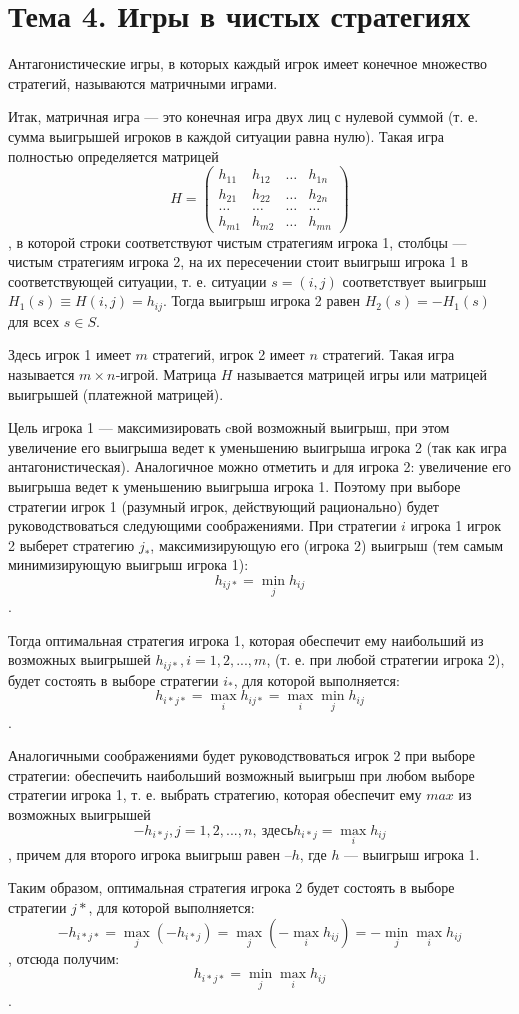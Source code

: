 \section{Тема 4. Игры в чистых стратегиях}

Антагонистические игры, в которых каждый игрок имеет конечное множество стратегий, называются матричными играми.

Итак, матричная игра --- это конечная игра двух лиц с нулевой суммой (т. е. сумма выигрышей игроков в каждой ситуации равна нулю). Такая игра полностью определяется матрицей
\[ H = \begin{pmatrix}
h_{11} & h_{12} & \dots & h_{1n} \\ 
h_{21} & h_{22} & \dots & h_{2n} \\ 
\dots & \dots & \dots & \dots \\ 
h_{m1} & h_{m2} & \dots & h_{mn}
\end{pmatrix}  \],
в которой строки соответствуют чистым стратегиям игрока 1, столбцы --- чистым стратегиям игрока 2, на их пересечении стоит выигрыш игрока 1 в соответствующей ситуации, т. е. ситуации $s = (i, j)$ соответствует выигрыш $H_1(s) \equiv H (i, j) =  h_{ij}$. Тогда выигрыш игрока 2 равен $H_2(s) = - H_1(s)$ для всех $s \in S$.

Здесь игрок 1 имеет $m$ стратегий, игрок 2 имеет $n$ стратегий. Такая игра называется $m\times n$‑игрой. Матрица $H$ называется матрицей игры или матрицей выигрышей (платежной матрицей).

Цель игрока 1 --- максимизировать cвой возможный выигрыш, при этом увеличение его выигрыша ведет к уменьшению выигрыша игрока 2 (так как игра антагонистическая). Аналогичное можно отметить и для игрока 2: увеличение его выигрыша ведет к уменьшению выигрыша игрока 1. Поэтому при выборе стратегии игрок 1 (разумный игрок, действующий рационально) будет руководствоваться следующими соображениями. При стратегии $i$ игрока 1 игрок 2 выберет стратегию $j_*$, максимизирующую его (игрока 2) выигрыш (тем самым минимизирующую выигрыш игрока 1):
\[ h_{ij*} = \min_j h_{ij}\].

Тогда оптимальная стратегия игрока 1, которая обеспечит ему наибольший из возможных выигрышей $h_{ij*}, i = 1, 2, ..., m$, (т. е. при любой стратегии игрока 2), будет состоять в выборе стратегии $i_*$, для которой выполняется:
\[ h_{i*j*} = \max_i h_{ij*} = \max_i \min_j h_{ij} \].

Аналогичными соображениями будет руководствоваться игрок 2 при выборе стратегии: обеспечить наибольший возможный выигрыш при любом выборе стратегии игрока 1, т. е. выбрать стратегию, которая обеспечит ему $max$ из возможных выигрышей
\[ -h_{i*j},j = 1, 2,..., n, \ \text{здесь} h_{i*j} = \max_i h_{ij} \],
причем для второго игрока выигрыш равен $–h$, где $h$ --- выигрыш игрока 1.

Таким образом, оптимальная стратегия игрока 2 будет состоять в выборе стратегии $j*$, для которой выполняется:
\[ -h _{i*j*} = \max_j (-h_{i*j}) = \max_j (-\max_i h_{ij}) = - \min_j \max_i h_{ij} \],
отсюда получим:
\[h_{i*j*} = \min_j \max_i h_{ij}\].